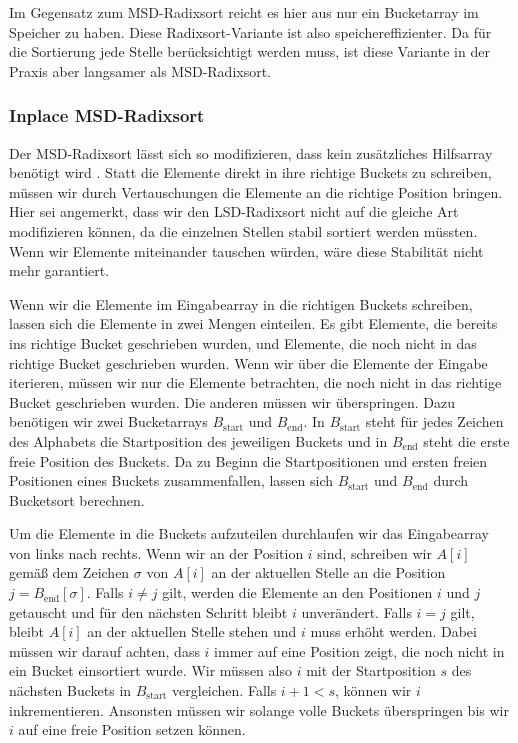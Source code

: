 Im Gegensatz zum MSD-Radixsort reicht es hier aus nur ein Bucketarray im Speicher zu haben.
Diese Radixsort-Variante ist also speichereffizienter.
Da für die Sortierung jede Stelle berücksichtigt werden muss,
ist diese Variante in der Praxis aber langsamer als MSD-Radixsort.

\subsubsection{Inplace MSD-Radixsort}
\label{sort:radix:inplace}

Der MSD-Radixsort lässt sich so modifizieren, dass kein zusätzliches Hilfsarray benötigt wird \cite{radixsort:inplace}.
Statt die Elemente direkt in ihre richtige Buckets zu schreiben,
müssen wir durch Vertauschungen die Elemente an die richtige Position bringen.
Hier sei angemerkt, dass wir den LSD-Radixsort nicht auf die gleiche Art modifizieren können,
da die einzelnen Stellen stabil sortiert werden müssten.
Wenn wir Elemente miteinander tauschen würden, wäre diese Stabilität nicht mehr garantiert.

Wenn wir die Elemente im Eingabearray in die richtigen Buckets schreiben,
lassen sich die Elemente in zwei Mengen einteilen.
Es gibt Elemente, die bereits ins richtige Bucket geschrieben wurden,
und Elemente, die noch nicht in das richtige Bucket geschrieben wurden.
Wenn wir über die Elemente der Eingabe iterieren, müssen wir nur die Elemente betrachten,
die noch nicht in das richtige Bucket geschrieben wurden.
Die anderen müssen wir überspringen.
Dazu benötigen wir zwei Bucketarrays $B_{\text{start}}$ und $B_{\text{end}}$.
In $B_{\text{start}}$ steht für jedes Zeichen des Alphabets die Startposition des jeweiligen Buckets 
und in $B_{\text{end}}$ steht die erste freie Position des Buckets.
Da zu Beginn die Startpositionen und ersten freien Positionen eines Buckets zusammenfallen,
lassen sich $B_{\text{start}}$ und $B_{\text{end}}$ durch Bucketsort berechnen.

Um die Elemente in die Buckets aufzuteilen durchlaufen wir das Eingabearray von links nach rechts.
Wenn wir an der Position $i$ sind, schreiben wir $A[i]$ gemäß dem Zeichen $\sigma$ von $A[i]$ an der
aktuellen Stelle an die Position $j = B_{\text{end}}[\sigma]$.
Falls $i \ne j$ gilt, werden die Elemente an den Positionen $i$ und $j$ getauscht
und für den nächsten Schritt bleibt $i$ unverändert.
Falls $i = j$ gilt, bleibt $A[i]$ an der aktuellen Stelle stehen und $i$ muss erhöht werden.
Dabei müssen wir darauf achten, dass $i$ immer auf eine Position zeigt,
die noch nicht in ein Bucket einsortiert wurde.
Wir müssen also $i$ mit der Startposition $s$ des nächsten Buckets in $B_{\text{start}}$ vergleichen.
Falls $i+1 < s$, können wir $i$ inkrementieren.
Ansonsten müssen wir solange volle Buckets überspringen bis wir $i$ auf eine freie Position setzen können.

